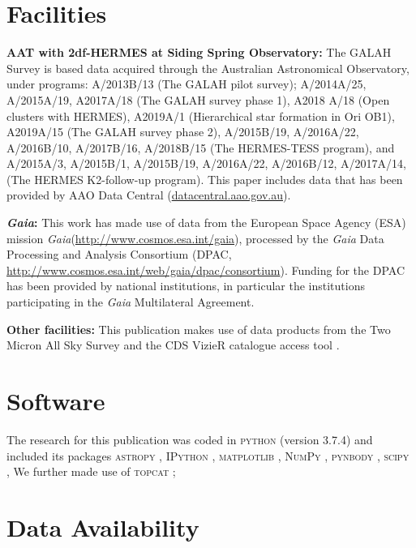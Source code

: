 \documentclass[fleqn,usenatbib]{mnras}
\newcommand{\Gaia}{\textit{Gaia}\xspace} %
\begin{document}
\section*{Facilities}

\textbf{AAT with 2df-HERMES at Siding Spring Observatory:} The GALAH Survey is based data acquired through the Australian Astronomical Observatory, under programs: A/2013B/13 (The GALAH pilot survey); A/2014A/25, A/2015A/19, A2017A/18 (The GALAH survey phase 1), A2018 A/18 (Open clusters with HERMES), A2019A/1 (Hierarchical star formation in Ori OB1), A2019A/15 (The GALAH survey phase 2), A/2015B/19, A/2016A/22, A/2016B/10, A/2017B/16, A/2018B/15 (The HERMES-TESS program), and A/2015A/3, A/2015B/1, A/2015B/19, A/2016A/22, A/2016B/12, A/2017A/14, (The HERMES K2-follow-up program). This paper includes data that has been provided by AAO Data Central (\url{datacentral.aao.gov.au}).

\textbf{\Gaia: } This work has made use of data from the European Space Agency (ESA) mission \Gaia (\url{http://www.cosmos.esa.int/gaia}), processed by the \Gaia Data Processing and Analysis Consortium (DPAC, \url{http://www.cosmos.esa.int/web/gaia/dpac/consortium}). Funding for the DPAC has been provided by national institutions, in particular the institutions participating in the \Gaia Multilateral Agreement. 

\textbf{Other facilities:} This publication makes use of data products from the Two Micron All Sky Survey \citep{Skrutskie2006} and the CDS VizieR catalogue access tool \citep{Vizier2000}.

\section*{Software}

The research for this publication was coded in \textsc{python} (version 3.7.4) and included its packages
\textsc{astropy} \citep[v. 3.2.2;][]{Robitaille2013,PriceWhelan2018},
\textsc{IPython} \citep[v. 7.8.0;][]{ipython},
\textsc{matplotlib} \citep[v. 3.1.3;][]{matplotlib},
\textsc{NumPy} \citep[v. 1.17.2;][]{numpy},
\textsc{pynbody} \citep[v. 1.1.0;][]{pynbody},
\textsc{scipy} \citep[version 1.3.1;][]{scipy},
We further made use of \textsc{topcat} \citep[version 4.7;][]{Taylor2005};

\section*{Data Availability}
\end{document}
